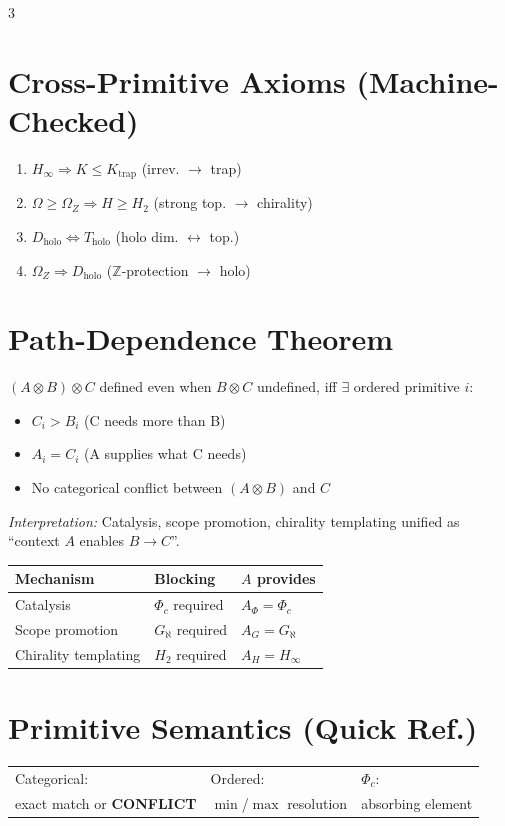 \documentclass[8pt,a4paper,landscape]{article}
\newcommand{\cat}[1]{\textcolor{catblue}{#1}}
\newcommand{\ord}[1]{\textcolor{ordgreen}{#1}}
\newcommand{\spec}[1]{\textcolor{specpurple}{#1}}
\newcommand{\conf}{\textcolor{confred}{\textbf{CONFLICT}}}
\begin{document}
\begin{multicols}{3}
\section*{Cross-Primitive Axioms (Machine-Checked)}
\footnotesize
\begin{enumerate}[leftmargin=*,label=\textbf{A\arabic*}.]
\item $H_\infty \Rightarrow K\le K_{\text{trap}}$ \hfill(irrev. $\to$ trap)
\item $\Omega\ge\Omega_Z \Rightarrow H\ge H_2$ \hfill(strong top. $\to$ chirality)
\item $D_{\text{holo}} \Leftrightarrow T_{\text{holo}}$ \hfill(holo dim. $\leftrightarrow$ top.)
\item $\Omega_Z \Rightarrow D_{\text{holo}}$ \hfill($\mathbb{Z}$-protection $\to$ holo)
\end{enumerate}

\section*{Path-Dependence Theorem}
\footnotesize
$(A\otimes B)\otimes C$ defined even when $B\otimes C$ undefined, iff $\exists$ ordered primitive $i$:
\begin{itemize}[leftmargin=*,nosep,topsep=4pt,itemsep=2pt]
\item $C_i > B_i$ (C needs more than B)
\item $A_i = C_i$ (A supplies what C needs)
\item No categorical conflict between $(A\otimes B)$ and $C$
\end{itemize}
\textit{Interpretation:} Catalysis, scope promotion, chirality templating unified as ``context $A$ enables $B\to C$''.

\begin{center}
\footnotesize
\renewcommand{\arraystretch}{1.1}
\begin{tabular}{|l|l|l|}
\hline
\textbf{Mechanism} & \textbf{Blocking} & \textbf{$A$ provides} \\
\hline
Catalysis & $\Phi_c$ required & $A_\Phi = \Phi_c$ \\
Scope promotion & $G_\aleph$ required & $A_G = G_\aleph$ \\
Chirality templating & $H_2$ required & $A_H = H_\infty$ \\
\hline
\end{tabular}
\end{center}

\section*{Primitive Semantics (Quick Ref.)}
\footnotesize
\begin{tabular}{@{}p{2.6cm}p{2.6cm}p{2.6cm}@{}}
\cat{Categorical:} & \ord{Ordered:} & \spec{$\Phi_c$:} \\
exact match or \conf & $\min$/$\max$ resolution & absorbing element \\
\end{tabular}


\end{multicols}
\end{document}
